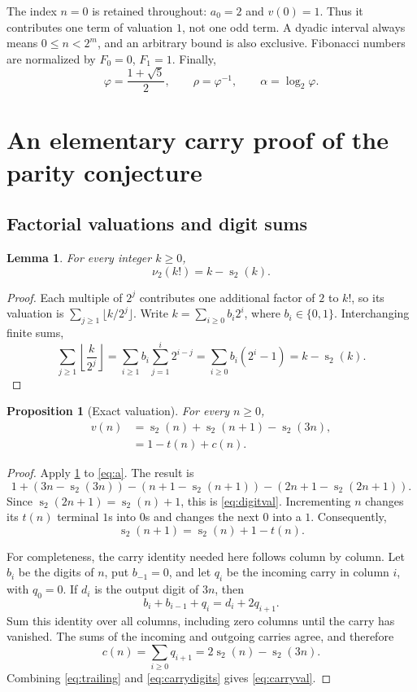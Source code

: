 \documentclass[11pt]{article}
\newtheorem{lemma}[theorem]{Lemma}
\newtheorem{proposition}[theorem]{Proposition}
\theoremstyle{definition}\newtheorem{definition}[theorem]{Definition}
\theoremstyle{remark}\newtheorem{remark}[theorem]{Remark}
\newcommand{\bit}{\operatorname{s}_2}
\newcommand{\ph}{\varphi}
\begin{document}
The index $n=0$ is retained throughout: $a_0=2$ and $v(0)=1$. Thus it
contributes one term of valuation $1$, not one odd term. A dyadic interval
always means $0\leq n<2^m$, and an arbitrary bound is also exclusive.
Fibonacci numbers are normalized by $F_0=0$, $F_1=1$. Finally,
\[
 \ph=\frac{1+\sqrt5}{2},\qquad \rho=\ph^{-1},\qquad
 \alpha=\log_2\ph.
\]

\section{An elementary carry proof of the parity conjecture}\label{sec:parity}

\subsection{Factorial valuations and digit sums}
\begin{lemma}\label{lem:legendre}
For every integer $k\geq0$,
\[
 \nu_2(k!)=k-\bit(k).
\]
\end{lemma}
\begin{proof}
Each multiple of $2^j$ contributes one additional factor of $2$ to $k!$,
so its valuation is $\sum_{j\geq1}\lfloor k/2^j\rfloor$. Write
$k=\sum_{i\geq0}b_i2^i$, where $b_i\in\{0,1\}$. Interchanging finite sums,
\[
 \sum_{j\geq1}\left\lfloor\frac{k}{2^j}\right\rfloor
 =\sum_{i\geq1}b_i\sum_{j=1}^i2^{i-j}
 =\sum_{i\geq0}b_i(2^i-1)=k-\bit(k).
\]
\end{proof}

\begin{proposition}[Exact valuation]\label{prop:valuation}
For every $n\geq0$,
\begin{align}
 v(n)&=\bit(n)+\bit(n+1)-\bit(3n),\label{eq:digitval}\\
     &=1-t(n)+c(n).\label{eq:carryval}
\end{align}
\end{proposition}
\begin{proof}
Apply \cref{lem:legendre} to \eqref{eq:a}. The result is
\[
 1+(3n-\bit(3n))-(n+1-\bit(n+1))
 -(2n+1-\bit(2n+1)).
\]
Since $\bit(2n+1)=\bit(n)+1$, this is \eqref{eq:digitval}.
Incrementing $n$ changes its $t(n)$ terminal $1$s into $0$s and changes
the next $0$ into a $1$. Consequently,
\begin{equation}\label{eq:trailing}
 \bit(n+1)=\bit(n)+1-t(n).
\end{equation}

For completeness, the carry identity needed here follows column by
column. Let $b_i$ be the digits of $n$, put $b_{-1}=0$, and let $q_i$ be
the incoming carry in column $i$, with $q_0=0$. If $d_i$ is the output
digit of $3n$, then
\[
 b_i+b_{i-1}+q_i=d_i+2q_{i+1}.
\]
Sum this identity over all columns, including zero columns until the
carry has vanished. The sums of the incoming and outgoing carries agree,
and therefore
\begin{equation}\label{eq:carrydigits}
 c(n)=\sum_{i\geq0}q_{i+1}=2\bit(n)-\bit(3n).
\end{equation}
Combining \eqref{eq:trailing} and \eqref{eq:carrydigits} gives
\eqref{eq:carryval}.
\end{proof}
\end{document}
